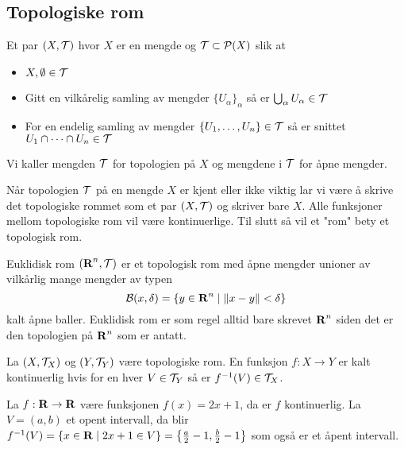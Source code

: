 \subsection{Topologiske rom}\label{Sek:TopRom}
\begin{definisjon}\label{Def:TopRom}
    Et par $(X,\mathcal{T})$ hvor $X$ er en mengde og $\mathcal{T}\subset\mathcal{P}(X)$ slik at 
    \begin{itemize}
        \item $X,\emptyset\in\mathcal{T}$
        \item Gitt en vilkårelig samling av mengder $\{U_\alpha\}_{\alpha}$ så er $\bigcup_\alpha U_\alpha\in\mathcal{T}$
        \item For en endelig samling av mengder $\{U_1,\dots,U_n\}\in\mathcal{T}$ så er snittet $U_1\cap\dots\cap U_n\in\mathcal{T}$
    \end{itemize}
    Vi kaller mengden $\mathcal{T}$ for topologien på $X$ og mengdene i $\mathcal{T}$ for åpne mengder.
\end{definisjon}

Når topologien $\mathcal{T}$ på en mengde $X$ er kjent eller ikke viktig lar vi være å skrive det topologiske rommet som et par $(X,\mathcal{T})$ og skriver bare $X$. Alle funksjoner mellom topologiske rom vil være kontinuerlige. Til slutt så vil et "rom" bety et topologisk rom.

\begin{eksempel}\label{Ex:EukTRom}
    Euklidisk rom $(\textnormal{\textbf{{R}}}^n,\mathcal{T})$ er et topologisk rom med åpne mengder unioner av vilkårlig mange mengder av typen
    \[\mathcal{B}(x,\delta) = \{y\in\textnormal{\textbf{{R}}}^n\;|\; \|x-y\|<\delta\}\]
    kalt åpne baller. Euklidisk rom er som regel alltid bare skrevet $\textnormal{\textbf{{R}}}^n$ siden det er den topologien på
$\textnormal{\textbf{{R}}}^n$ som er antatt.
\end{eksempel}

\begin{definisjon}\label{Def:KontFunk}
    La $(X,\mathcal{T}_X)$ og $(Y,\mathcal{T}_Y)$ være topologiske rom. En funksjon $f: X\to Y$ er kalt kontinuerlig hvis for en hver \(V\in\mathcal{T}_Y\) så er \(f^{-1}(V)\in\mathcal{T}_X\).
\end{definisjon}

\begin{eksempel}\label{Ex:KontFunk}
    La $f: \textnormal{\textbf{{R}}}\to \textnormal{\textbf{{R}}}$ være funksjonen $f(x)=2x+1$, da er $f$ kontinuerlig. La $V = (a,b)$ et opent intervall,
da blir $f^{-1}(V) = \{x\in\textnormal{\textbf{{R}}}\;|\;2x+1\in V\}=\left\{\frac{a}{2}-1,\frac{b}{2}-1\right\}$ som også er et åpent intervall.
\end{eksempel}

